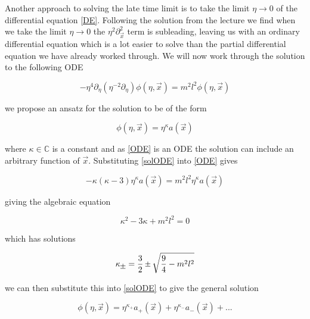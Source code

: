 \documentclass[a4paper,11pt]{article}
\newcommand{\Mypm}{\mathbin{\tikz [x=1.4ex,y=1.4ex,line width=.1ex] \draw (0.0,0) -- (1.0,0) (0.5,0.08) -- (0.5,0.92) (0.0,0.5) -- (1.0,0.5);}}%
\numberwithin{equation}{section}
\numberwithin{figure}{section}
\begin{document}
\begin{large}
\vspace{1cm}

Another approach to solving the late time limit is to take the limit $\eta\rightarrow0$ of the differential equation \eqref{DE}. Following the solution from the lecture \cite{lecture1} we find when we take the limit $\eta\rightarrow0$ the $\eta^2\partial^2_{\Vec{x}}$ term is subleading, leaving us with an ordinary differential equation which is a lot easier to solve than the partial differential equation we have already worked through. We will now work through the solution to the following ODE

\begin{equation}
\label{ODE}    
    -\eta^4\partial_\eta(\eta^{-2}\partial_\eta)\phi(\eta,\Vec{x})=m^2l^2\phi(\eta,\Vec{x})
\end{equation}

we propose an ansatz for the solution to be of the form

\begin{equation}
\label{solODE}    
    \phi(\eta,\Vec{x})=\eta^\kappa a(\Vec{x})
\end{equation}

where $\kappa\in \mathbb{C}$ is a constant and as \eqref{ODE} is an ODE the solution can include an arbitrary function of $\Vec{x}$. Substituting \eqref{solODE} into \eqref{ODE} gives

\begin{equation}
\label{solsubODE}    
    -\kappa(\kappa-3)\eta^\kappa a(\Vec{x})=m^2l^2\eta^\kappa a(\Vec{x})
\end{equation}

giving the algebraic equation 

\begin{equation}
\label{algE}    
    \kappa^2-3\kappa+m^2l^2=0     
\end{equation}


which has solutions

\begin{equation}
\label{kappapm}    
    \kappa_{\Mypm}=\frac{3}{2}\Mypm\sqrt{\frac{9}{4}-m^2l^2}
\end{equation}

we can then substitute this into \eqref{solODE} to give the general solution

\begin{equation}
\label{gensolODE}    
    \phi(\eta,\Vec{x})=\eta^{\kappa_+}a_+(\Vec{x})+\eta^{\kappa_-}a_-(\Vec{x})+...
\end{equation}



\end{large}
\end{document}
